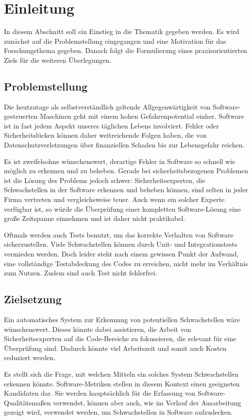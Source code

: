 \section{Einleitung}
\label{sec:einleitung}
In diesem Abschnitt soll ein Einstieg in die Thematik gegeben werden.
Es wird zunächst auf die Problemstellung eingegangen und eine Motivation für das Forschungsthema gegeben.
Danach folgt die Formulierung eines praxisorientierten Ziels für die weiteren Überlegungen.

\subsection{Problemstellung}
Die heutzutage als selbstverständlich geltende Allgegenwärtigkeit von Software-gesteuerten Maschinen geht mit einem hohen Gefahrenpotential einher.
Software ist in fast jedem Aspekt unseres täglichen Lebens involviert.
Fehler oder Sicherheitslücken können daher weitreichende Folgen haben, die von Datenschutzverletzungen über finanziellen Schaden bis zur Lebensgefahr reichen.

Es ist zweifelsohne wünschenswert, derartige Fehler in Software so schnell wie möglich zu erkennen und zu beheben.
Gerade bei sicherheitsbezogenen Problemen ist die Lösung des Problems jedoch schwer:
Sicherheitsexperten, die Schwachstellen in der Software erkennen und beheben können, sind selten in jeder Firma vertreten und vergleichsweise teuer.
Auch wenn ein solcher Experte verfügbar ist, so würde die Überprüfung einer kompletten Software-Lösung eine große Zeitspanne einnehmen und ist daher nicht praktikabel.

Oftmals werden auch Tests benutzt, um das korrekte Verhalten von Software sicherzustellen.
Viele Schwachstellen können durch Unit- und Integrationstests vermieden werden.
Doch leider steht nach einem gewissen Punkt der Aufwand, eine vollständige Testabdeckung des Codes zu erreichen, nicht mehr im Verhältnis zum Nutzen.
Zudem sind auch Test nicht fehlerfrei.

\subsection{Zielsetzung}
Ein automatisches System zur Erkennung von potentiellen Schwachstellen wäre wünschenswert.
Dieses könnte dabei assistieren, die Arbeit von Sicherheitsexperten auf die Code-Bereiche zu fokussieren, die relevant für eine Überprüfung sind.
Dadurch könnte viel Arbeitszeit und somit auch Kosten reduziert werden.

Es stellt sich die Frage, mit welchen Mitteln ein solches System Schwachstellen erkennen könnte.
Software-Metriken stellen in diesem Kontext einen geeigneten Kandidaten dar.
Sie werden hauptsächlich für die Erfassung von Software-Qualitätsmaßen verwendet, können aber auch, wie im Verlauf der Ausarbeitung gezeigt wird, verwendet werden, um Schwachstellen in Software aufzudecken.
